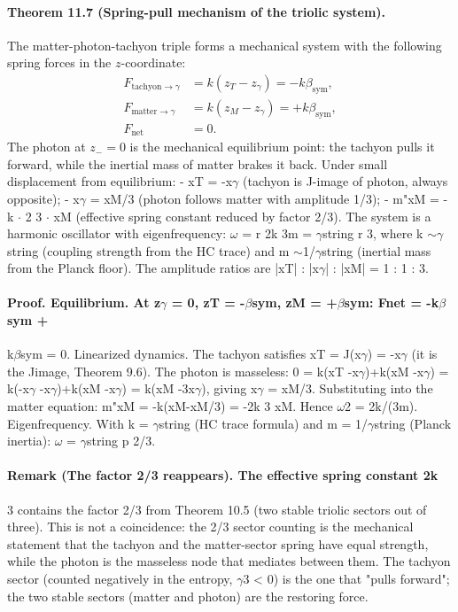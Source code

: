 \documentclass[12pt,a4paper]{article}
\begin{document}
\paragraph*{Theorem 11.7 (Spring-pull mechanism of the triolic system).}
The matter-photon-tachyon triple forms a mechanical system with the following spring forces in the $z$-coordinate:
\[
\begin{aligned}
F_{\mathrm{tachyon}\to\gamma} &= k(z_T-z_\gamma) = -k\beta_{\mathrm{sym}},\\
F_{\mathrm{matter}\to\gamma} &= k(z_M-z_\gamma) = +k\beta_{\mathrm{sym}},\\
F_{\mathrm{net}} &= 0.
\end{aligned}
\]
The photon at $z_-=0$ is the mechanical equilibrium point: the tachyon pulls it forward, while the inertial mass of matter brakes it back. Under small displacement from equilibrium:
- xT = -x$\gamma$ (tachyon is J-image of photon, always opposite);
- x$\gamma$ = xM/3 (photon follows matter with amplitude 1/3);
- m"xM = -k $\cdot$ 2
3 $\cdot$ xM (effective spring constant reduced by factor 2/3). The system is a harmonic oscillator with eigenfrequency: $\omega$ = r 2k 3m = $\gamma$string r 3, where k $\sim$$\gamma$string (coupling strength from the HC trace) and m $\sim$1/$\gamma$string (inertial mass from the Planck floor). The amplitude ratios are |xT| : |x$\gamma$| : |xM| = 1 : 1 : 3.
\paragraph*{Proof. Equilibrium. At z$\gamma$ = 0, zT = -$\beta$sym, zM = +$\beta$sym: Fnet = -k$\beta$sym +}
k$\beta$sym = 0. Linearized dynamics. The tachyon satisfies xT = J(x$\gamma$) = -x$\gamma$ (it is the Jimage, Theorem 9.6). The photon is masseless: 0 = k(xT -x$\gamma$)+k(xM -x$\gamma$) = k(-x$\gamma$ -x$\gamma$)+k(xM -x$\gamma$) = k(xM -3x$\gamma$), giving x$\gamma$ = xM/3. Substituting into the matter equation: m"xM = -k(xM-xM/3) = -2k 3 xM. Hence $\omega$2 = 2k/(3m). Eigenfrequency. With k = $\gamma$string (HC trace formula) and m = 1/$\gamma$string (Planck inertia): $\omega$ = $\gamma$string p 2/3.
\paragraph*{Remark (The factor 2/3 reappears). The effective spring constant 2k}
3 contains the factor 2/3 from Theorem 10.5 (two stable triolic sectors out of three). This is not a coincidence: the 2/3 sector counting is the mechanical statement that the tachyon and the matter-sector spring have equal strength, while the photon is the masseless node that mediates between them. The tachyon sector (counted negatively in the entropy, $\gamma$3 < 0) is the one that "pulls forward"; the two stable sectors (matter and photon) are the restoring force.
\end{document}

